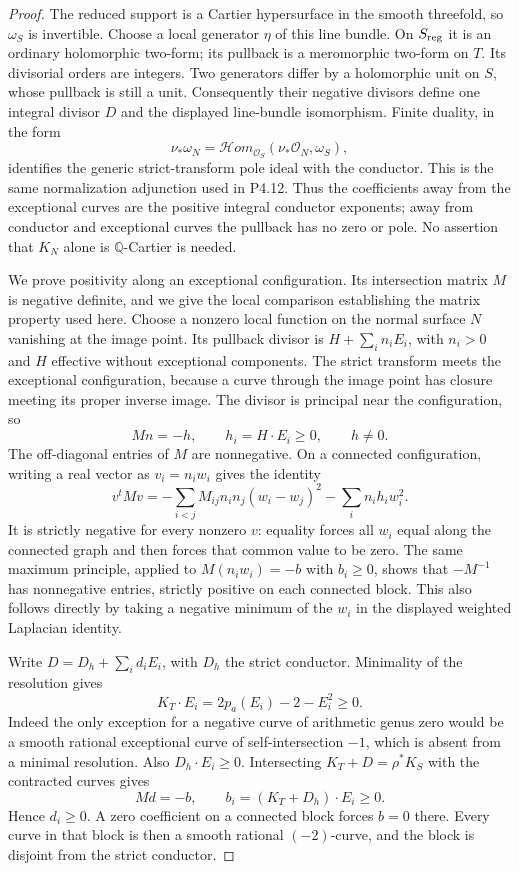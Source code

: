 \begin{proof}
The reduced support is a Cartier hypersurface in
the smooth threefold, so $\omega_S$ is invertible.
Choose a local generator $\eta$ of this line
bundle. On $S_{\rm reg}$ it is an ordinary
holomorphic two-form; its pullback is a
meromorphic two-form on $T$. Its divisorial
orders are integers. Two generators differ by
a holomorphic unit on $S$, whose pullback is
still a unit. Consequently their negative
divisors define one integral divisor $D$ and
the displayed line-bundle isomorphism.
Finite duality, in the form
\[
 \nu_*\omega_N
  =\mathcal Hom_{\mathcal O_S}
       (\nu_*\mathcal O_N,\omega_S),
\]
identifies the generic strict-transform pole
ideal with the conductor. This is the same
normalization adjunction used in P4.12. Thus
the coefficients away from the exceptional
curves are the positive integral conductor
exponents; away from conductor and exceptional
curves the pullback has no zero or pole.
No assertion that $K_N$ alone is
$\mathbb Q$-Cartier is needed.

We prove positivity along an exceptional
configuration. Its intersection matrix $M$
is negative definite, and we give the local
comparison establishing the matrix property
used here. Choose a nonzero local function
on the normal surface $N$ vanishing at the
image point. Its pullback divisor is
$H+\sum_i n_iE_i$, with $n_i>0$ and $H$
effective without exceptional components.
The strict transform meets the exceptional
configuration, because a curve through the
image point has closure meeting its proper
inverse image. The divisor is principal
near the configuration, so
\[
 Mn=-h,\qquad h_i=H\cdot E_i\ge0,
 \qquad h\ne0.
\]
The off-diagonal entries of $M$ are
nonnegative. On a connected configuration,
writing a real vector as $v_i=n_iw_i$
gives the identity
\[
 v^tMv
 =-\sum_{i<j}M_{ij}n_in_j(w_i-w_j)^2
   -\sum_i n_ih_iw_i^2.
\]
It is strictly negative for every nonzero
$v$: equality forces all $w_i$ equal along
the connected graph and then forces that
common value to be zero. The same maximum
principle, applied to $M(n_iw_i)=-b$ with
$b_i\ge0$, shows that $-M^{-1}$ has
nonnegative entries, strictly positive on
each connected block. This also follows
directly by taking a negative minimum of
the $w_i$ in the displayed weighted
Laplacian identity.

Write $D=D_h+\sum_i d_iE_i$, with $D_h$
the strict conductor. Minimality of the
resolution gives
\[
 K_T\cdot E_i=2p_a(E_i)-2-E_i^2\ge0.
\]
Indeed the only exception for a negative
curve of arithmetic genus zero would be
a smooth rational exceptional curve of
self-intersection $-1$, which is absent
from a minimal resolution. Also
$D_h\cdot E_i\ge0$. Intersecting
$K_T+D=\rho^*K_S$ with the contracted
curves gives
\[
 Md=-b,
 \qquad b_i=(K_T+D_h)\cdot E_i\ge0.
\]
Hence $d_i\ge0$. A zero coefficient on
a connected block forces $b=0$ there.
Every curve in that block is then a
smooth rational $(-2)$-curve, and the
block is disjoint from the strict
conductor.


\end{proof}
